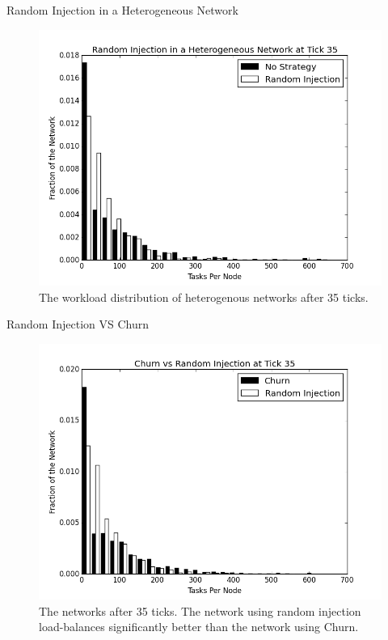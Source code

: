 \documentclass[11pt]{beamer}
\begin{document}


\begin{frame}{Random Injection in a Heterogeneous Network}
\begin{figure}
	\centering
	\includegraphics[width=0.7\linewidth]{figs/randomStableHistHetero35}
	\caption[Random injection in a Heterogenous Network]{The workload distribution of heterogenous networks after 35 ticks.  }
	\label{fig:randomStableHistHetero35}
\end{figure}
\end{frame}



\begin{frame}{Random Injection VS Churn}
\begin{figure}
	\centering
	\includegraphics[width=0.7\linewidth]{figs/churnInjectionHist35}
	\caption[Churn vs Random Injection after 35 ticks.]{The networks after 35 ticks.  The network using random injection load-balances significantly better than the network using Churn.}
	\label{fig:churnInjectionHist35}
\end{figure}

\end{frame}
\end{document}
